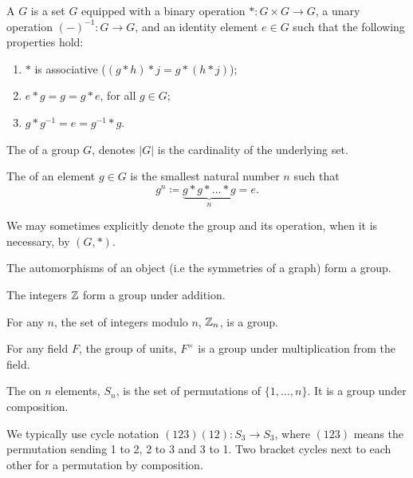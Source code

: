 \begin{definition}\label{def:intro-to-group-theory:group}
  A  \(G\) is a set \(G\) equipped with a binary operation \(* : G \times G \to G\), a unary operation \((-)^{-1}: G \to G\), and an identity element \(e \in G\) such that the following properties hold:

  \begin{enumerate}
    \item \(*\) is associative (\((g * h) * j = g * (h * j)\));
    \item \(e * g = g = g * e\), for all \(g \in G\);
    \item \(g * g^{-1} = e = g^{-1} * g\).
  \end{enumerate}

  The  of a group \(G\), denotes \(|G|\) is the cardinality of the underlying set.

  The  of an element \(g \in G\) is the smallest natural number \(n\) such that
  \[g^{n} \coloneqq \underbrace{g * g * \ldots * g}_{n} = e.\]
\end{definition}


We may sometimes explicitly denote the group and its operation, when it is necessary, by \((G, *)\).

\begin{example}
  The automorphisms of an object (i.e the symmetries of a graph) form a group.
\end{example}


\begin{example}
  The integers \(\mathbb{Z}\) form a group under addition.
\end{example}

\begin{example}
  For any \(n\), the set of integers modulo \(n\), \(\mathbb{Z}_{n}\), is a group.
\end{example}

\begin{example}
  For any field \(F\), the group of units, \(F^{\times}\) is a group under multiplication from the field.
\end{example}

\begin{example}\label{ex:group-theory:symmetric-group}
  The  on \(n\) elements, \(S_{n}\), is the set of permutations of \(\{1, \ldots, n\}\).
  It is a group under composition.


  We typically use cycle notation \((123)(12): S_{3} \to S_{3}\), where \((123)\) means the permutation sending 1 to 2, 2 to 3 and 3 to 1.
  Two bracket cycles next to each other for a permutation by composition.
\end{example}

